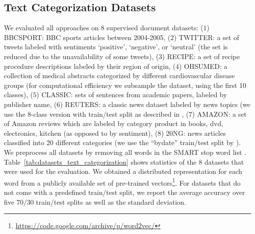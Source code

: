 \documentclass[twoside]{article}
\begin{document}
\subsection{Text Categorization Datasets}
We evaluated all approaches on $8$ supervised document datasets: 
($1$) BBCSPORT: BBC sports articles between 2004-2005, ($2$) TWITTER: a set of tweets labeled with sentiments ‘positive’, ‘negative’, or ‘neutral’ (the set is reduced due to the unavailability of some tweets), ($3$) RECIPE: a set of recipe procedure descriptions labeled by their region of origin, ($4$) OHSUMED: a collection of medical abstracts categorized by different cardiovascular disease groups (for computational efficiency we subsample the dataset, using the first 10 classes), ($5$) CLASSIC: sets of sentences from academic papers, labeled by publisher name, ($6$) REUTERS: a classic news dataset labeled by news topics (we use the 8-class version with train/test split as described in \cite{cachopo2007improving}, ($7$) AMAZON: a set of Amazon reviews which are labeled by category product in {books, dvd, electronics, kitchen} (as opposed to by sentiment), ($8$) 20NG: news articles classified into 20 different categories (we use the “bydate” train/test split by \cite{cachopo2007improving}).
We preprocess all datasets by removing all words in the SMART stop word list \citep{salton1971smart}.
Table~\ref{tab:datasets_text_categorization} shows statistics of the $8$ datasets that were used for the evaluation.
We obtained a distributed representation for each word from a publicly available set of pre-trained vectors\footnote{\url{https://code.google.com/archive/p/word2vec/}}.
For datasets that do not come with a predefined train/test split, we report the average accuracy over five $70/30$ train/test splits as well as the standard deviation.

\begin{table}[t]
\centering
\caption{Datasets used in text categorization experiments.}
\label{tab:datasets_text_categorization}
\end{table}
\end{document}
